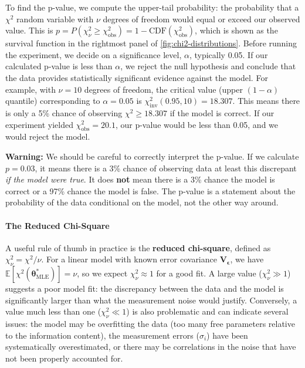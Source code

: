 To find the p-value, we compute the upper-tail probability: the probability that a $\chi^2$ random variable with $\nu$ degrees of freedom would equal or exceed our observed value. This is $p = P(\chi^2_\nu \ge \chi^2_{\text{obs}}) = 1 - \text{CDF}(\chi^2_{\text{obs}})$, which is shown as the survival function in the rightmost panel of \autoref{fig:chi2-distributions}. Before running the experiment, we decide on a significance level, $\alpha$, typically 0.05. If our calculated p-value is less than $\alpha$, we reject the null hypothesis and conclude that the data provides statistically significant evidence against the model. For example, with $\nu=10$ degrees of freedom, the critical value (upper $(1-\alpha)$ quantile) corresponding to $\alpha=0.05$ is $\chi^2_{\text{inv}}(0.95, 10) = 18.307$. This means there is only a 5\% chance of observing $\chi^2 \ge 18.307$ if the model is correct. If our experiment yielded $\chi^2_{\text{obs}} = 20.1$, our p-value would be less than 0.05, and we would reject the model.

\begin{warningBox}
    \textbf{Warning:} We should be careful to correctly interpret the p-value. If we calculate $p=0.03$, it means there is a 3\% chance of observing data at least this discrepant \textit{if the model were true}. It does \textbf{not} mean there is a 3\% chance the model is correct or a 97\% chance the model is false. The p-value is a statement about the probability of the data conditional on the model, not the other way around.
\end{warningBox}

\paragraph*{The Reduced Chi-Square}
A useful rule of thumb in practice is the \textbf{reduced chi-square}, defined as $\chi^2_\nu = \chi^2 / \nu$. For a linear model with known error covariance $\mathbf{V}_{\boldsymbol{\epsilon}}$, we have $\mathbb{E}[\chi^2(\boldsymbol{\theta}^*_{\text{MLE}})] = \nu$, so we expect $\chi^2_\nu \approx 1$ for a good fit. A large value ($\chi^2_\nu \gg 1$) suggests a poor model fit: the discrepancy between the data and the model is significantly larger than what the measurement noise would justify. Conversely, a value much less than one ($\chi^2_\nu \ll 1$) is also problematic and can indicate several issues: the model may be overfitting the data (too many free parameters relative to the information content), the measurement errors ($\sigma_i$) have been systematically overestimated, or there may be correlations in the noise that have not been properly accounted for. 

